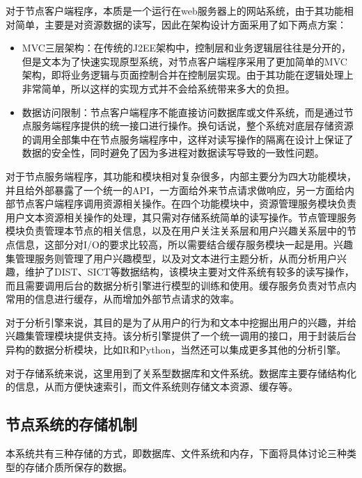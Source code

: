 对于节点客户端程序，本质是一个运行在web服务器上的网站系统，由于其功能相对简单，主要是对资源数据的读写，因此在架构设计方面采用了如下两点方案：
\begin{itemize}
  \item MVC三层架构：在传统的J2EE架构中，控制层和业务逻辑层往往是分开的，但是文本为了快速实现原型系统，对节点客户端程序采用了更加简单的MVC架构，即将业务逻辑与页面控制合并在控制层实现。由于其功能在逻辑处理上非常简单，所以这样的实现方式并不会给系统带来多大的负担。
  \item 数据访问限制：节点客户端程序不能直接访问数据库或文件系统，而是通过节点服务端程序提供的统一接口进行操作。换句话说，整个系统对底层存储资源的调用全部集中在节点服务端程序中，这样对读写操作的隔离在设计上保证了数据的安全性，同时避免了因为多进程对数据读写导致的一致性问题。
\end{itemize}

对于节点服务端程序，其功能和模块相对复杂很多，内部主要分为四大功能模块，并且给外部暴露了一个统一的API，一方面给外来节点请求做响应，另一方面给内部节点客户端程序调用资源相关操作。在四个功能模块中，资源管理服务模块负责用户文本资源相关操作的处理，其只需对存储系统简单的读写操作。节点管理服务模块负责管理本节点的相关信息，以及在用户关注关系层和用户兴趣关系层中的节点信息，这部分对I/O的要求比较高，所以需要结合缓存服务模块一起是用。兴趣集管理服务则管理了用户兴趣模型，以及对文本进行主题分析，从而分析用户兴趣，维护了DIST、SICT等数据结构，该模块主要对文件系统有较多的读写操作，而且需要调用后台的数据分析引擎进行模型的训练和使用。缓存服务负责对节点内常用的信息进行缓存，从而增加外部节点请求的效率。

对于分析引擎来说，其目的是为了从用户的行为和文本中挖掘出用户的兴趣，并给兴趣集管理模块提供支持。该分析引擎提供了一个统一调用的接口，用于封装后台异构的数据分析模块，比如R和Python，当然还可以集成更多其他的分析引擎。

对于存储系统来说，这里用到了关系型数据库和文件系统。数据库主要存储结构化的信息，从而方便快速索引，而文件系统则存储文本资源、缓存等。

\subsection{节点系统的存储机制}
本系统共有三种存储的方式，即数据库、文件系统和内存，下面将具体讨论三种类型的存储介质所保存的数据。


